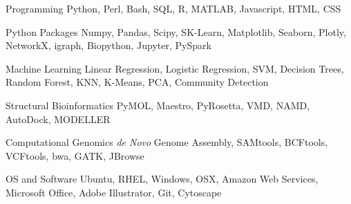 \vspace{2mm}

\begin{cvskills}

  \cvskill
    {Programming} %
    {Python, Perl, Bash, SQL, R, MATLAB, Javascript, HTML, CSS} %

  \cvskill
    {Python Packages} %
    {Numpy, Pandas, Scipy, SK-Learn, Matplotlib, Seaborn, Plotly, NetworkX, igraph, Biopython, Jupyter, PySpark} %
    
  \cvskill
    {Machine Learning} %
    {Linear Regression, Logistic Regression, SVM, Decision Trees, Random Forest, KNN, K-Means, PCA, Community Detection} %
    
  \cvskill
    {Structural Bioinformatics} %
    {PyMOL, Maestro, PyRosetta, VMD, NAMD, AutoDock, MODELLER} %

  \cvskill
    {Computational Genomics} %
    {\textit{de Novo} Genome Assembly, SAMtools, BCFtools, VCFtools, bwa, GATK, JBrowse} %

  \cvskill
    {OS and Software} %
    {Ubuntu, RHEL, Windows, OSX, Amazon Web Services, Microsoft Office, Adobe Illustrator, Git, Cytoscape} %
    
\vspace{-8.0mm}
\end{cvskills}